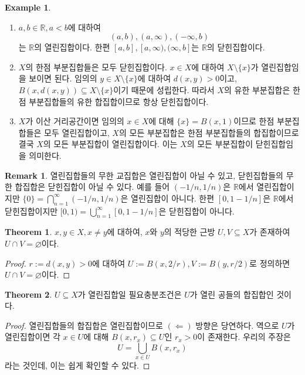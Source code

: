 \documentclass[11pt]{book}
\numberwithin{equation}{chapter}
\def\RR{\mathbb{R}}
\theoremstyle{definition}
\newtheorem{thm}{Theorem}[section]
\newtheorem*{rem}{Remark}
\newtheorem*{ex}{Example}
\begin{document}
\begin{ex}
    \quad

    \begin{enumerate} [label=(\alph*), leftmargin=2\parindent]
        \item \(a, b \in \RR, a < b\)에 대하여
        \[
            (a, b), (a, \infty), (-\infty, b)    
        \]
        는 \(\RR\)의 열린집합이다. 한편 \([a, b], [a, \infty), (\infty, b]\)는 \(\RR\)의 닫힌집합이다.
        \item \(X\)의 한점 부분집합들은 모두 닫힌집합이다. \(x \in X\)에 대하여 \(X \setminus \{x\}\)가 열린집합임을 보이면 된다. 임의의 \(y \in X \setminus \{x\}\)에 대하여 \(d(x, y) > 0\)이고, \(B(x, d(x,y)) \subseteq X \setminus \{x\}\)이기 때문에 성립한다. 따라서 \(X\)의 유한 부분집합은 한점 부분집합들의 유한 합집합이므로 항상 닫힌집합이다.
        \item \(X\)가 이산 거리공간이면 임의의 \(x \in X\)에 대해 \(\{x\} = B(x, 1)\)이므로 한점 부분집합들은 모두 열린집합이고, \(X\)의 모든 부분집합은 한점 부분집합들의 합집합이므로 결국 \(X\)의 모든 부분집합이 열린집합이다. 이는 \(X\)의 모든 부분집합이 닫힌집합임을 의미한다.
    \end{enumerate}
\end{ex}

\begin{rem}
    열린집합들의 무한 교집합은 열린집합이 아닐 수 있고, 닫힌집합들의 무한 합집합은 닫힌집합이 아닐 수 있다. 예를 들어 \((-1/n, 1/n)\)은 \(\RR\)에서 열린집합이지만 \(\{0\} = \bigcap_{n=1}^\infty (-1/n, 1/n)\)은 열린집합이 아니다. 한편 \([0, 1-1/n]\)은 \(\RR\)에서 닫힌집합이지만 \([0, 1) = \bigcup_{n=1}^\infty [0, 1-1/n]\)은 닫힌집합이 아니다.
\end{rem}

\begin{thm}
    \(x, y \in X, x \ne y\)에 대하여, \(x\)와 \(y\)의 적당한 근방 \(U, V \subseteq X\)가 존재하여 \(U \cap V = \varnothing\)이다.
\end{thm}
\begin{proof}
    \(r := d(x, y) > 0\)에 대하여 \(U := B(x, 2/r), V := B(y, r/2)\)로 정의하면 \(U \cap V = \varnothing\)이다.
\end{proof}

\begin{thm}
    \(U \subseteq X\)가 열린집합일 필요충분조건은 \(U\)가 열린 공들의 합집합인 것이다.
\end{thm}
\begin{proof}
    열린집합들의 합집합은 열린집합이므로 \((\Leftarrow)\) 방향은 당연하다. 역으로 \(U\)가 열린집합이면 각 \(x \in U\)에 대해 \(B(x, r_x) \subseteq U\)인 \(r_x > 0\)이 존재한다. 우리의 주장은
    \[
    U = \bigcup_{x \in U} B(x, r_x)    
    \]
    라는 것인데, 이는 쉽게 확인할 수 있다.
\end{proof}
\end{document}

